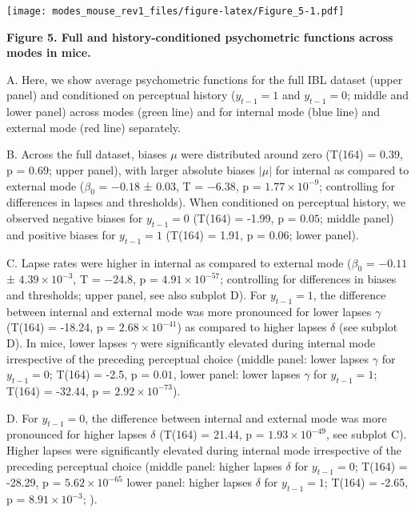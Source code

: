 \documentclass[
]{article}
\begin{document}
\texttt{[image: modes\_mouse\_rev1\_files/figure-latex/Figure\_5-1.pdf]}

\textbf{Figure 5. Full and history-conditioned psychometric functions
across modes in mice.}

A. Here, we show average psychometric functions for the full IBL dataset
(upper panel) and conditioned on perceptual history (\(y_{t-1} = 1\) and
\(y_{t-1} = 0\); middle and lower panel) across modes (green line) and
for internal mode (blue line) and external mode (red line) separately.

B. Across the full dataset, biases \(\mu\) were distributed around zero
(T(164) = 0.39, p = \(0.69\); upper panel), with larger absolute biases
\(|\mu|\) for internal as compared to external mode (\(\beta_0\) =
\(-0.18\) ± \(0.03\), T = \(-6.38\), p =
\(\ensuremath{1.77\times 10^{-9}}\); controlling for differences in
lapses and thresholds). When conditioned on perceptual history, we
observed negative biases for \(y_{t-1} = 0\) (T(164) = -1.99, p =
\(0.05\); middle panel) and positive biases for \(y_{t-1} = 1\) (T(164)
= 1.91, p = \(0.06\); lower panel).

C. Lapse rates were higher in internal as compared to external mode
(\(\beta_0\) = \(-0.11\) ± \(\ensuremath{4.39\times 10^{-3}}\), T =
\(-24.8\), p = \(\ensuremath{4.91\times 10^{-57}}\); controlling for
differences in biases and thresholds; upper panel, see also subplot D).
For \(y_{t-1} = 1\), the difference between internal and external mode
was more pronounced for lower lapses \(\gamma\) (T(164) = -18.24, p =
\(\ensuremath{2.68\times 10^{-41}}\)) as compared to higher lapses
\(\delta\) (see subplot D). In mice, lower lapses \(\gamma\) were
significantly elevated during internal mode irrespective of the
preceding perceptual choice (middle panel: lower lapses \(\gamma\) for
\(y_{t-1} = 0\); T(164) = -2.5, p = \(0.01\), lower panel: lower lapses
\(\gamma\) for \(y_{t-1} = 1\); T(164) = -32.44, p =
\(\ensuremath{2.92\times 10^{-73}}\)).

D. For \(y_{t-1} = 0\), the difference between internal and external
mode was more pronounced for higher lapses \(\delta\) (T(164) = 21.44, p
= \(\ensuremath{1.93\times 10^{-49}}\), see subplot C). Higher lapses
were significantly elevated during internal mode irrespective of the
preceding perceptual choice (middle panel: higher lapses \(\delta\) for
\(y_{t-1} = 0\); T(164) = -28.29, p =
\(\ensuremath{5.62\times 10^{-65}}\) lower panel: higher lapses
\(\delta\) for \(y_{t-1} = 1\); T(164) = -2.65, p =
\(\ensuremath{8.91\times 10^{-3}}\); ).
\end{document}
